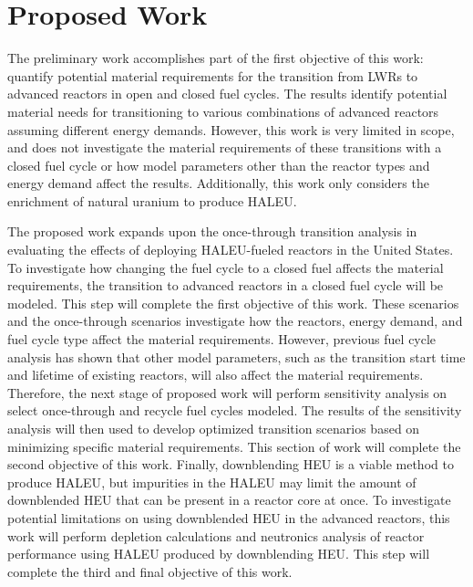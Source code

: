\section{Proposed Work}
The preliminary work accomplishes part of the first objective of this work: 
quantify potential material requirements for the transition from 
\glspl{LWR}
to advanced reactors in open and closed fuel cycles. The results identify 
potential material needs for transitioning to various combinations of 
advanced reactors assuming different energy demands. However, this work 
is very limited in scope, and does not investigate the material requirements 
of these transitions with a closed fuel cycle or how model parameters 
other 
than the reactor types and energy demand affect the results. Additionally, 
this work only considers the enrichment of natural uranium to produce 
\gls{HALEU}. 

The proposed work expands upon the once-through transition analysis in 
evaluating the effects of deploying \gls{HALEU}-fueled reactors in the 
United States. 
To investigate how changing the fuel cycle to a closed fuel affects the 
material requirements, the transition to advanced reactors in a closed fuel 
cycle will be modeled. This step will complete the first 
objective of this work. These scenarios and the once-through scenarios 
investigate how the reactors, energy demand, and fuel cycle type affect 
the material requirements. However, previous fuel cycle analysis has 
shown that other model parameters, such as the transition start time 
and lifetime of existing reactors, will also affect the material 
requirements. Therefore, 
the next stage of proposed work will perform sensitivity analysis on 
select once-through and recycle fuel cycles modeled. The results of the 
sensitivity 
analysis will then used to develop optimized transition scenarios based 
on minimizing specific material requirements. This section of work will 
complete the second objective of this work. Finally, downblending 
\gls{HEU} is a viable 
method to produce \gls{HALEU}, but impurities in the \gls{HALEU} may limit 
the amount of downblended \gls{HEU} that can be present in a reactor core 
at once. To investigate potential limitations on using downblended 
\gls{HEU} in the advanced reactors, this work will perform depletion 
calculations and neutronics analysis of reactor performance using 
\gls{HALEU} produced by 
downblending \gls{HEU}. This step will complete the third and final
objective of this work. 

